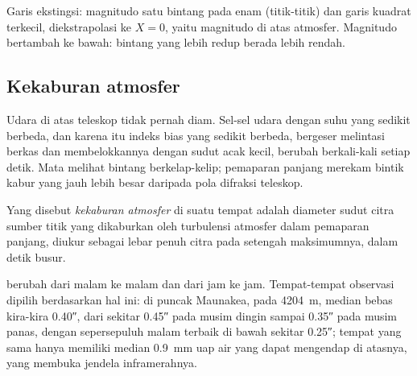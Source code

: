\begin{omfigure}

{\small Garis ekstingsi: magnitudo satu bintang pada enam  (titik-titik) dan garis kuadrat terkecil, diekstrapolasi ke $X = 0$, yaitu magnitudo di atas atmosfer. Magnitudo bertambah ke bawah: bintang yang lebih redup berada lebih rendah.}
\end{omfigure}

\subsection*{Kekaburan atmosfer}

Udara di atas teleskop tidak pernah diam. Sel-sel udara dengan suhu yang sedikit berbeda, dan karena itu indeks bias yang sedikit berbeda, bergeser melintasi berkas dan membelokkannya dengan sudut acak kecil, berubah berkali-kali setiap detik. Mata melihat bintang berkelap-kelip; pemaparan panjang merekam bintik kabur yang jauh lebih besar daripada pola difraksi teleskop.

\begin{definition}\label{def:b1:observing-the-sky:seeing}
Yang disebut \emph{kekaburan atmosfer} di suatu tempat adalah diameter sudut citra sumber titik yang dikaburkan oleh turbulensi atmosfer dalam pemaparan panjang, diukur sebagai lebar penuh citra pada setengah maksimumnya, dalam detik busur.
\end{definition}

 berubah dari malam ke malam dan dari jam ke jam. Tempat-tempat observasi dipilih berdasarkan hal ini: di puncak Maunakea, pada \qty{4204}{m}, median  bebas kira-kira \ang{;;0.40}, dari sekitar \ang{;;0.45} pada musim dingin sampai \ang{;;0.35} pada musim panas, dengan sepersepuluh malam terbaik di bawah sekitar \ang{;;0.25}; tempat yang sama hanya memiliki median \qty{0.9}{mm} uap air yang dapat mengendap di atasnya, yang membuka jendela inframerahnya.

